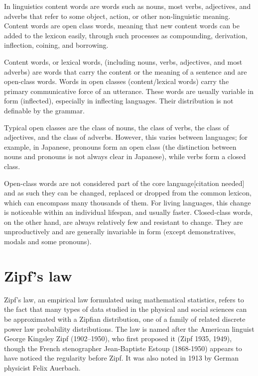       In linguistics content words are words such as nouns, most verbs, adjectives, and adverbs that refer to some object, action, or other non-linguistic meaning. Content words are open class words, meaning that new content words can be added to the lexicon easily, through such processes as compounding, derivation, inflection, coining, and borrowing.
        
      Content words, or lexical words, (including nouns, verbs, adjectives, and most adverbs) are words that carry the content or the meaning of a sentence and are open-class words. Words in open classes (content/lexical words) carry the primary communicative force of an utterance. These words are usually variable in form (inflected), especially in inflecting languages. Their distribution is not definable by the grammar.

      Typical open classes are the class of nouns, the class of verbs, the class of adjectives, and the class of adverbs. However, this varies between languages; for example, in Japanese, pronouns form an open class (the distinction between nouns and pronouns is not always clear in Japanese), while verbs form a closed class.

      Open-class words are not considered part of the core language[citation needed] and as such they can be changed, replaced or dropped from the common lexicon, which can encompass many thousands of them. For living languages, this change is noticeable within an individual lifespan, and usually faster. Closed-class words, on the other hand, are always relatively few and resistant to change. They are unproductively and are generally invariable in form (except demonstratives, modals and some pronouns).
  
  \section{Zipf's law}
  
    Zipf's law, an empirical law formulated using mathematical statistics, refers to the fact that many types of data studied in the physical and social sciences can be approximated with a Zipfian distribution, one of a family of related discrete power law probability distributions. The law is named after the American linguist George Kingsley Zipf (1902–1950), who first proposed it (Zipf 1935, 1949), though the French stenographer Jean-Baptiste Estoup (1868-1950) appears to have noticed the regularity before Zipf\cite{ManningSchutze1999}. It was also noted in 1913 by German physicist Felix Auerbach\cite{Auerbach1913}.
    
